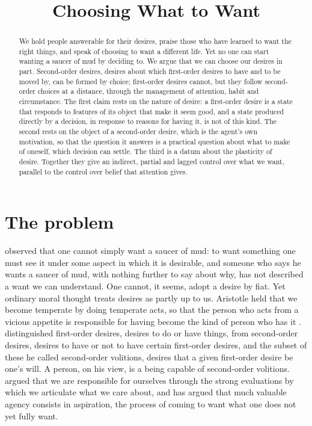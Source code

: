 \documentclass{situationist-preprint}
\title{Choosing What to Want}
\begin{document}
\maketitle

\begin{abstract}
We hold people answerable for their desires, praise those who have learned to want the right things, and speak of choosing to want a different life. Yet no one can start wanting a saucer of mud by deciding to. We argue that we can choose our desires in part. Second-order desires, desires about which first-order desires to have and to be moved by, can be formed by choice; first-order desires cannot, but they follow second-order choices at a distance, through the management of attention, habit and circumstance. The first claim rests on the nature of desire: a first-order desire is a state that responds to features of its object that make it seem good, and a state produced directly by a decision, in response to reasons for having it, is not of this kind. The second rests on the object of a second-order desire, which is the agent's own motivation, so that the question it answers is a practical question about what to make of oneself, which decision can settle. The third is a datum about the plasticity of desire. Together they give an indirect, partial and lagged control over what we want, parallel to the control over belief that attention gives.
\end{abstract}

\section{The problem}

\citet{Anscombe1957} observed that one cannot simply want a saucer of mud: to want something one must see it under some aspect in which it is desirable, and someone who says he wants a saucer of mud, with nothing further to say about why, has not described a want we can understand. One cannot, it seems, adopt a desire by fiat. Yet ordinary moral thought treats desires as partly up to us. Aristotle held that we become temperate by doing temperate acts, so that the person who acts from a vicious appetite is responsible for having become the kind of person who has it \citep[II.1, III.5]{AristotleNE}. \citet{Frankfurt1971} distinguished first-order desires, desires to do or have things, from second-order desires, desires to have or not to have certain first-order desires, and the subset of these he called second-order volitions, desires that a given first-order desire be one's will. A person, on his view, is a being capable of second-order volitions. \citet{Taylor1976} argued that we are responsible for ourselves through the strong evaluations by which we articulate what we care about, and \citet{Callard2018} has argued that much valuable agency consists in aspiration, the process of coming to want what one does not yet fully want.
\end{document}

